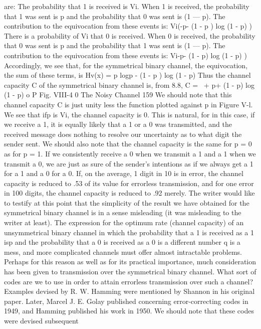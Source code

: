 {{{{{{{{{are:
The probability that 1 is received is Vi. When 1 is received, the
probability that 1 was sent is p and the probability that 0 was
sent is (1 — p). The contribution to the equivocation from these
events is:
Vi(-p\ogp - (1 - p ) log (1 - p) )
There is a probability of Vi that 0 is received. When 0 is received,
the probability that 0 was sent is p and the probability that 1 was
sent is (1 — p). The contribution to the equivocation from these
events is:
Vi{-p\ogp - (1 - p) log (1 - p) )
Accordingly, we see that, for the symmetrical binary channel, the
equivocation, the sum of these terms, is
Hv(x) = p logp - (1 - p ) log (1 - p)
Thus the channel capacity C of the symmetrical binary channel
is, from 8.8,
C = \ + p\ogp + (1 - p) log (1 - p)
o P
Fig. VIII-4
0
The Noisy Channel
159
We should note that this channel capacity C is just unity less the
function plotted against p in Figure V-l. We see that ifp is Vi, the
channel capacity is 0. This is natural, for in this case, if we receive
a 1, it is equally likely that a 1 or a 0 was transmitted, and the
received message does nothing to resolve our uncertainty as to
what digit the sender sent. We should also note that the channel
capacity is the same for p = 0 as for p = 1. If we consistently
receive a 0 when we transmit a 1 and a 1 when we transmit a 0,
we are just as sure of the sender’s intentions as if we always get a
1 for a 1 and a 0 for a 0.
If, on the average, 1 digit in 10 is in error, the channel capacity
is reduced to .53 of its value for errorless transmission, and for one
error in 100 digits, the channel capacity is reduced to .92 merely.
The writer would like to testify at this point that the simplicity
of the result we have obtained for the symmetrical binary channel
is in a sense misleading (it was misleading to the writer at least).
The expression for the optimum rate (channel capacity) of an
unsymmetrical binary channel in which the probability that a 1 is
received as a 1 isp and the probability that a 0 is received as a 0
is a different number q is a mess, and more complicated channels
must offer almost intractable problems.
Perhaps for this reason as well as for its practical importance,
much consideration has been given to transmission over the symmetrical
binary channel. What sort of codes are we to use in order
to attain errorless transmission over such a channel? Examples
devised by R. W. Hamming were mentioned by Shannon in his
original paper. Later, Marcel J. E. Golay published concerning
error-correcting codes in 1949, and Hamming published his work
in 1950. We should note that these codes were devised subsequent
}}}}}}}}}}
